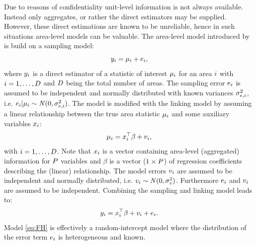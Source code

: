 \documentclass[article]{ajs}
\begin{document}
Due to reasons of confidentiality unit-level information is not always available. Instead only aggregates, or rather the direct estimators may be supplied. However, these direct estimations are known to be unreliable, hence in such situations area-level models can be valuable. The area-level model introduced by \cite{fay79} is build on a sampling model:
%
\[y_{i} = \mu_{i} + e_{i},\]
%
where $y_{i}$ is a direct estimator of a statistic of interest $\mu_{i}$ for an area $i$ with $i = 1, \dots, D$ and $D$ being the total number of areas. The sampling error $e_{i}$ is assumed to be independent and normally distributed with known variances $\sigma_{e, i}^2$, i.e. $e_{i}|\mu_{i} \sim \mathit{N}(0, \sigma_{e, i}^2)$. The model is modified with the linking model by assuming a linear relationship between the true area statistic $\mu_{i}$ and some auxiliary variables $x_{i}$:
%
\[\mu_{i} = x_{i}^\top \beta + v_{i},\] 
%
with $i=1,\dots, D$. Note that $x_{i}$ is a vector containing area-level (aggregated) information for $P$ variables and $\beta$ is a vector ($1\times P$) of regression coefficients describing the (linear) relationship. The model errors $v_{i}$ are assumed to be independent and normally distributed, i.e. $v_{i} \sim \mathit{N}(0, \sigma_v^2)$. Furthermore $e_{i}$ and $v_{i}$ are assumed to be independent. Combining the sampling and linking model leads to:
\begin{equation}
\label{eq:FH}
y_{i} = x_{i}^\top \beta + v_{i} + e_{i}.
\end{equation} 
%
Model \ref{eq:FH} is effectively a random-intercept model where the distribution of the error term $e_{i}$ is heterogeneous and known. 
\end{document}
